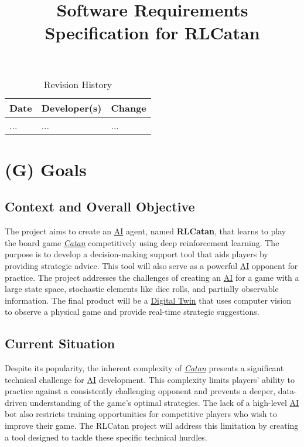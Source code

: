 \documentclass{article}
\title{Software Requirements Specification for RLCatan\\\progname}
\author{\authname}
\date{}
\newcommand{\Catan}{\href{https://en.wikipedia.org/wiki/Catan}{Catan}}
\newcommand{\AI}{\href{https://en.wikipedia.org/wiki/Artificial_intelligence}{AI}}
\newcommand{\DigitalTwin}{\href{https://en.wikipedia.org/wiki/Digital_twin}{Digital Twin}}
\begin{document}
\maketitle

\begin{table}[hp]
\caption{Revision History} \label{TblRevisionHistory}
\begin{tabularx}{\textwidth}{llX}
\toprule
\textbf{Date} & \textbf{Developer(s)} & \textbf{Change}\\
\midrule
... & ... & ...\\
\bottomrule
\end{tabularx}
\end{table}

\section*{(G) Goals}\label{sec:srs-goals}
\renewcommand{\thesubsection}{G.\arabic{subsection}}

\subsection{Context and Overall Objective}\label{subsec:context-and-overall-objective}
The project aims to create an \AI{} agent, named \textbf{RLCatan}, that learns to play the board game \emph{\Catan{}} competitively using deep reinforcement learning. The purpose is to develop a decision-making support tool that aids players by providing strategic advice. This tool will also serve as a powerful \AI{} opponent for practice. The project addresses the challenges of creating an \AI{} for a game with a large state space, stochastic elements like dice rolls, and partially observable information. The final product will be a \DigitalTwin{} that uses computer vision to observe a physical game and provide real-time strategic suggestions.

\subsection{Current Situation}\label{subsec:current-situation}
Despite its popularity, the inherent complexity of \emph{\Catan{}} presents a significant technical challenge for \AI{} development. This complexity limits players' ability to practice against a consistently challenging opponent and prevents a deeper, data-driven understanding of the game's optimal strategies. The lack of a high-level \AI{} bot also restricts training opportunities for competitive players who wish to improve their game. The RLCatan project will address this limitation by creating a tool designed to tackle these specific technical hurdles.
\end{document}
